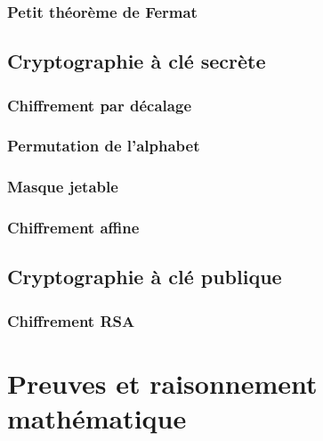 \documentclass[
  letterpaper,
]{scrbook}
\theoremstyle{plain}
\theoremstyle{definition}
\theoremstyle{definition}
\theoremstyle{remark}
\begin{document}
\hypertarget{petit-thuxe9oruxe8me-de-fermat}{%
\subsection{Petit théorème de
Fermat}\label{petit-thuxe9oruxe8me-de-fermat}}

\hypertarget{cryptographie-uxe0-cluxe9-secruxe8te}{%
\section{Cryptographie à clé
secrète}\label{cryptographie-uxe0-cluxe9-secruxe8te}}

\hypertarget{chiffrement-par-duxe9calage}{%
\subsection{Chiffrement par
décalage}\label{chiffrement-par-duxe9calage}}

\hypertarget{permutation-de-lalphabet}{%
\subsection{Permutation de l'alphabet}\label{permutation-de-lalphabet}}

\hypertarget{masque-jetable}{%
\subsection{Masque jetable}\label{masque-jetable}}

\hypertarget{chiffrement-affine}{%
\subsection{Chiffrement affine}\label{chiffrement-affine}}

\hypertarget{cryptographie-uxe0-cluxe9-publique}{%
\section{Cryptographie à clé
publique}\label{cryptographie-uxe0-cluxe9-publique}}

\hypertarget{chiffrement-rsa}{%
\subsection{Chiffrement RSA}\label{chiffrement-rsa}}


\hypertarget{preuves-et-raisonnement-mathuxe9matique}{%
\chapter{Preuves et raisonnement
mathématique}\label{preuves-et-raisonnement-mathuxe9matique}}
\end{document}
